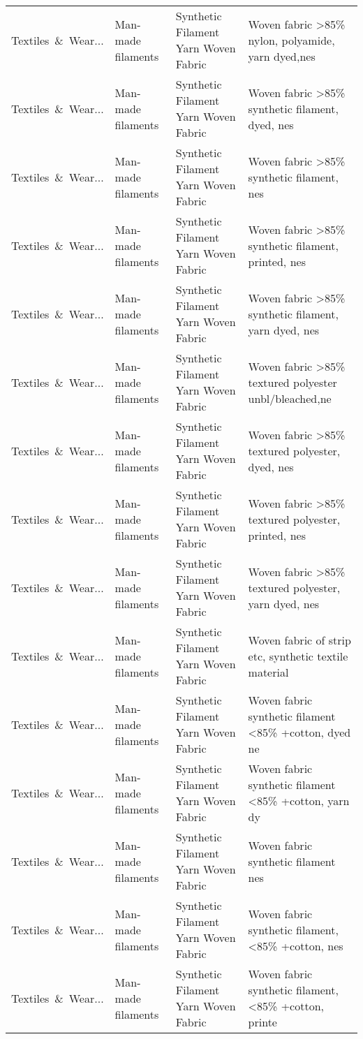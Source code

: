 \begin{appendices}
\begin{xltabular}{\textwidth}{|p{0.10\textwidth}|p{0.25\textwidth}|p{0.24\textwidth}|p{0.31\textwidth}|}
Textiles\ \&\ Wear... & Man-made filaments & Synthetic Filament Yarn Woven Fabric & Woven fabric >85\% nylon, polyamide, yarn dyed,nes \\
Textiles\ \&\ Wear... & Man-made filaments & Synthetic Filament Yarn Woven Fabric & Woven fabric >85\% synthetic filament, dyed, nes \\
Textiles\ \&\ Wear... & Man-made filaments & Synthetic Filament Yarn Woven Fabric & Woven fabric >85\% synthetic filament, nes \\
Textiles\ \&\ Wear... & Man-made filaments & Synthetic Filament Yarn Woven Fabric & Woven fabric >85\% synthetic filament, printed, nes \\
Textiles\ \&\ Wear... & Man-made filaments & Synthetic Filament Yarn Woven Fabric & Woven fabric >85\% synthetic filament, yarn dyed, nes \\
Textiles\ \&\ Wear... & Man-made filaments & Synthetic Filament Yarn Woven Fabric & Woven fabric >85\% textured polyester unbl/bleached,ne \\
Textiles\ \&\ Wear... & Man-made filaments & Synthetic Filament Yarn Woven Fabric & Woven fabric >85\% textured polyester, dyed, nes \\
Textiles\ \&\ Wear... & Man-made filaments & Synthetic Filament Yarn Woven Fabric & Woven fabric >85\% textured polyester, printed, nes \\
Textiles\ \&\ Wear... & Man-made filaments & Synthetic Filament Yarn Woven Fabric & Woven fabric >85\% textured polyester, yarn dyed, nes \\
Textiles\ \&\ Wear... & Man-made filaments & Synthetic Filament Yarn Woven Fabric & Woven fabric of strip etc, synthetic textile material \\
Textiles\ \&\ Wear... & Man-made filaments & Synthetic Filament Yarn Woven Fabric & Woven fabric synthetic filament <85\% +cotton, dyed ne \\
Textiles\ \&\ Wear... & Man-made filaments & Synthetic Filament Yarn Woven Fabric & Woven fabric synthetic filament <85\% +cotton, yarn dy \\
Textiles\ \&\ Wear... & Man-made filaments & Synthetic Filament Yarn Woven Fabric & Woven fabric synthetic filament nes \\
Textiles\ \&\ Wear... & Man-made filaments & Synthetic Filament Yarn Woven Fabric & Woven fabric synthetic filament, <85\% +cotton, nes \\
Textiles\ \&\ Wear... & Man-made filaments & Synthetic Filament Yarn Woven Fabric & Woven fabric synthetic filament, <85\% +cotton, printe \\

\end{xltabular}
\end{appendices}
